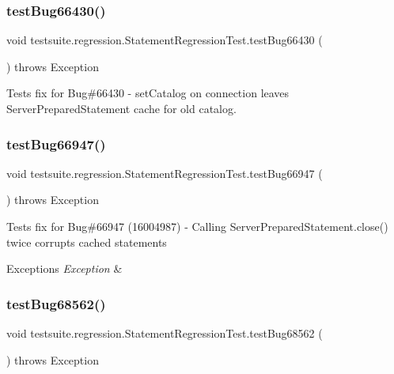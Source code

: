 \subsubsection{\texorpdfstring{test\+Bug66430()}{testBug66430()}}
{\footnotesize\ttfamily void testsuite.\+regression.\+Statement\+Regression\+Test.\+test\+Bug66430 (\begin{DoxyParamCaption}{ }\end{DoxyParamCaption}) throws Exception}

Tests fix for Bug\#66430 -\/ set\+Catalog on connection leaves Server\+Prepared\+Statement cache for old catalog. \mbox{\label{classtestsuite_1_1regression_1_1_statement_regression_test_a222cfacd79b9dcf61c6ebefe3966ede7}} 
\subsubsection{\texorpdfstring{test\+Bug66947()}{testBug66947()}}
{\footnotesize\ttfamily void testsuite.\+regression.\+Statement\+Regression\+Test.\+test\+Bug66947 (\begin{DoxyParamCaption}{ }\end{DoxyParamCaption}) throws Exception}

Tests fix for Bug\#66947 (16004987) -\/ Calling Server\+Prepared\+Statement.\+close() twice corrupts cached statements


\begin{DoxyExceptions}{Exceptions}
{\em Exception} & \\
\hline
\end{DoxyExceptions}
\mbox{\label{classtestsuite_1_1regression_1_1_statement_regression_test_a98f77aa1cdaf8554dcfff5b368c4e90a}} 
\subsubsection{\texorpdfstring{test\+Bug68562()}{testBug68562()}}
{\footnotesize\ttfamily void testsuite.\+regression.\+Statement\+Regression\+Test.\+test\+Bug68562 (\begin{DoxyParamCaption}{ }\end{DoxyParamCaption}) throws Exception}

